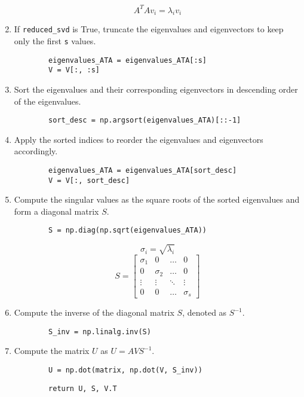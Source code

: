 \documentclass{article} %
\theoremstyle{definition}
\theoremstyle{remark}
\theoremstyle{plain}
\begin{document}
\begin{enumerate}
        \[
        A^T A v_i = \lambda_i v_i
        \]

        \item If \verb|reduced_svd| is True, truncate the eigenvalues and eigenvectors to keep only the first \verb|s| values.

        \begin{verbatim}
        eigenvalues_ATA = eigenvalues_ATA[:s]
        V = V[:, :s]
        \end{verbatim}
    
        \item Sort the eigenvalues and their corresponding eigenvectors in descending order of the eigenvalues.

    
        \begin{verbatim}
        sort_desc = np.argsort(eigenvalues_ATA)[::-1]
        \end{verbatim}
    
        \item Apply the sorted indices to reorder the eigenvalues and eigenvectors accordingly.

        \begin{verbatim}
        eigenvalues_ATA = eigenvalues_ATA[sort_desc]
        V = V[:, sort_desc]
        \end{verbatim}
    
        \item Compute the singular values as the square roots of the sorted eigenvalues and form a diagonal matrix \(S\).
    
        \begin{verbatim}
        S = np.diag(np.sqrt(eigenvalues_ATA))
        \end{verbatim}
    
        \[
        \sigma_i = \sqrt{\lambda_i}
        \]
        \[
        S = \begin{bmatrix} \sigma_1 & 0 & \dots & 0 \\ 0 & \sigma_2 & \dots & 0 \\ \vdots & \vdots & \ddots & \vdots \\ 0 & 0 & \dots & \sigma_s \end{bmatrix}
        \]

        \item Compute the inverse of the diagonal matrix \(S\), denoted as \(S^{-1}\).

        \begin{verbatim}
        S_inv = np.linalg.inv(S)
        \end{verbatim}
    
        \item Compute the matrix \(U\) as \(U = AVS^{-1}\).

        \begin{verbatim}
        U = np.dot(matrix, np.dot(V, S_inv))
        \end{verbatim}
    
        \begin{verbatim}
        return U, S, V.T
        \end{verbatim}
    \end{enumerate}
\end{document}
